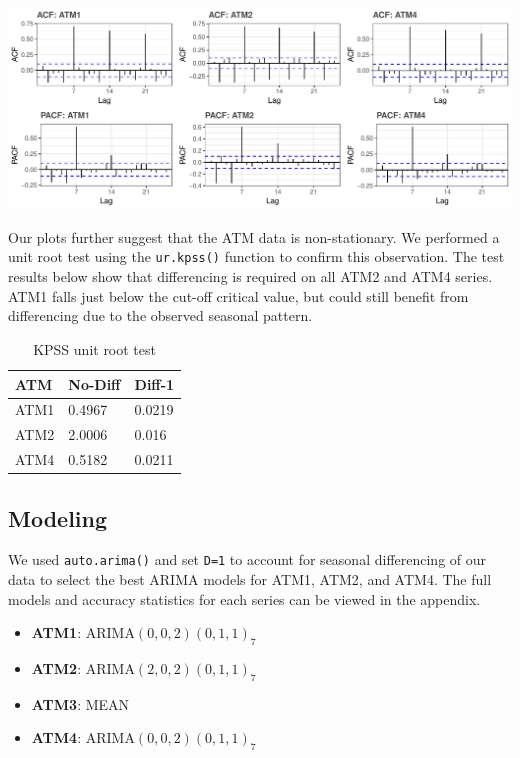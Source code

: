 \documentclass[openany]{book}
\providecommand{\tightlist}{%
  \setlength{\itemsep}{0pt}\setlength{\parskip}{0pt}}
\begin{document}
\includegraphics{Part-A-JM_JO_files/figure-latex/unnamed-chunk-5-1.pdf}

Our plots further suggest that the ATM data is non-stationary. We
performed a unit root test using the \texttt{ur.kpss()} function to
confirm this observation. The test results below show that differencing
is required on all ATM2 and ATM4 series. ATM1 falls just below the
cut-off critical value, but could still benefit from differencing due to
the observed seasonal pattern.

\begin{table}[H]

\caption{\label{tab:unnamed-chunk-6}KPSS unit root test}
\centering
\begin{tabular}{l|l|l}
\hline
\textbf{ATM} & \textbf{No-Diff} & \textbf{Diff-1}\\
\hline
\rowcolor{gray!6}  ATM1 & 0.4967 & 0.0219\\
\hline
ATM2 & 2.0006 & 0.016\\
\hline
\rowcolor{gray!6}  ATM4 & 0.5182 & 0.0211\\
\hline
\end{tabular}
\end{table}

\hypertarget{modeling}{%
\subsection{Modeling}\label{modeling}}

We used \texttt{auto.arima()} and set \texttt{D=1} to account for
seasonal differencing of our data to select the best ARIMA models for
ATM1, ATM2, and ATM4. The full models and accuracy statistics for each
series can be viewed in the appendix.

\begin{itemize}
\tightlist
\item
  \textbf{ATM1}: ARIMA\((0,0,2)(0,1,1)_7\)
\item
  \textbf{ATM2}: ARIMA\((2,0,2)(0,1,1)_7\)
\item
  \textbf{ATM3}: MEAN
\item
  \textbf{ATM4}: ARIMA\((0,0,2)(0,1,1)_7\)
\end{itemize}
\end{document}
